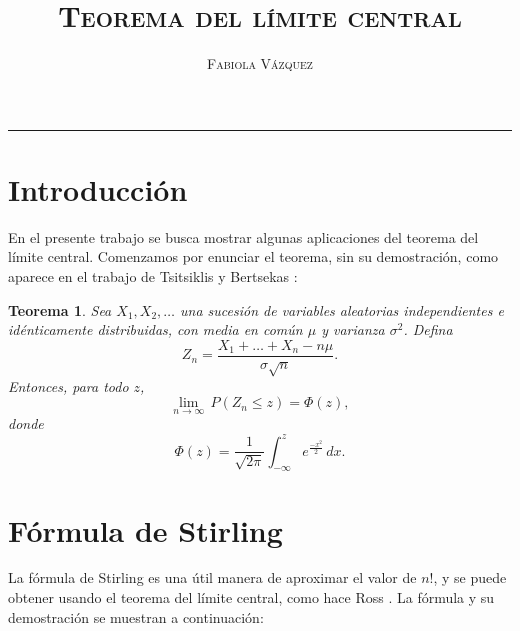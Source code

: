 \documentclass[12pt,letterpaper]{article}
\title{\textsc{Teorema del límite central}}
\author{\textsc{Fabiola Vázquez}}
\newcommand\pr[1]{\, P \left( #1 \right)}
\newtheorem{teo}{Teorema}
\begin{document}
\maketitle
\hrule 

\section{Introducción}
En el presente trabajo se busca mostrar algunas aplicaciones del teorema del límite central. Comenzamos por enunciar el teorema, sin su demostración, como aparece en el trabajo de Tsitsiklis y Bertsekas \cite{Bertsekas_Tsitsiklis_2008}:

\begin{teo}
	Sea $X_1, X_2, \dots$ una sucesión de variables aleatorias independientes e idénticamente distribuidas, con media en común $\mu$ y varianza $\sigma^2$. Defina 
	\begin{equation}
		Z_n = \frac{X_1 + \dots + X_n - n\mu}{\sigma \sqrt{n}}.
	\end{equation}
	Entonces, para todo $z$,
	\begin{equation}
		\lim_{n \rightarrow \infty} \pr{Z_n \leq z} = \Phi (z),
	\end{equation}
	donde
	\begin{equation}
		\Phi(z) = \frac{1}{\sqrt{2\pi} } \int_{-\infty}^{z} e^{\frac{-x^2}{2}} \, dx.
	\end{equation}
\end{teo}

\section{Fórmula de Stirling}
La fórmula de Stirling es una útil manera de aproximar el valor de $n!$, y se puede obtener usando el teorema del límite central, como hace Ross \cite{Ross_2000}. La fórmula y su demostración se muestran a continuación:
\end{document}
